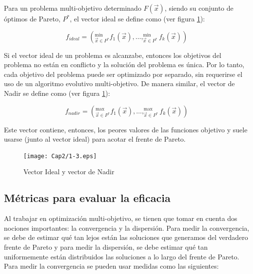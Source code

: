       \begin{definicion}
      Para un problema multi-objetivo determinado $F\left(\vec{x}\right)$, siendo su conjunto de \'optimos de Pareto, $P^*$, 
      el vector ideal se define como (ver figura \ref{fig:ideanadir}):
      
      \[  f_{ideal}= \left(^{\min}_{\vec{x}\in P^*}f_1\left(\vec{x}\right), \ldots, ^{\min}_{\vec{x}\in P^*}f_k\left(\vec{x}\right) \right)\]
      
      Si el vector ideal de un problema es alcanzabe, entonces los objetivos del problema no est\'an en conflicto 
      y la soluci\'on del problema es \'unica. Por lo tanto, cada objetivo del problema puede ser optimizado por separado,
      sin requerirse el uso de un algoritmo evolutivo multi-objetivo.
      De manera similar, el vector de Nadir se define como (ver figura \ref{fig:ideanadir}):
      
      \[  f_{nadir}= \left(^{\max}_{\vec{x}\in P^*}f_1\left(\vec{x}\right), \ldots, ^{\max}_{\vec{x}\in P^*}f_k\left(\vec{x}\right) \right)\]
      
      Este vector contiene, entonces, los peores valores de las funciones objetivo y suele usarse (junto al vector ideal)
      para acotar el frente de Pareto.      
      
      \end{definicion}
      
      \begin{figure}
	\centering
	\texttt{[image: Cap2/1-3.eps]}
	  \caption{Vector Ideal y vector de Nadir}
      \label{fig:ideanadir}
      \end{figure}
      
      \subsection{M\'etricas para evaluar la eficacia}
      \label{sec:metric}
      Al trabajar en optimizaci\'on multi-objetivo, se tienen que tomar en cuenta dos nociones importantes: la convergencia y la 
      dispersi\'on. Para medir la convergencia, se debe de estimar qu\'e tan lejos est\'an las soluciones que generamos del
      verdadero frente de Pareto y para medir la dispersi\'on, se debe estimar qu\'e tan uniformemente est\'an distribuidos 
      las soluciones a lo largo del frente de Pareto. Para medir la convergencia se pueden usar medidas como las siguientes:
      
